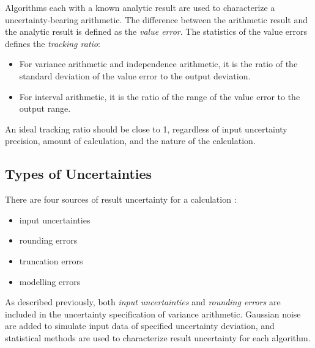 \documentclass[twoside]{article}
\numberwithin{equation}{section}
\begin{document}
Algorithms each with a known analytic result are used to characterize a uncertainty-bearing arithmetic. 
The difference between the arithmetic result and the analytic result is defined as the \emph{value error}.
The statistics of the value errors defines the \emph{tracking ratio}:
\begin{itemize}
\item For variance arithmetic and independence arithmetic, it is the ratio of the standard deviation of the value error to the output deviation.

\item For interval arithmetic, it is the ratio of the range of the value error to the output range.
\end{itemize}
An ideal tracking ratio should be close to 1, regardless of input uncertainty precision, amount of calculation, and the nature of the calculation.


\subsection{Types of Uncertainties}

There are four sources of result uncertainty for a calculation \cite{Statistical_Methods}\cite{Numerical_Recipes}:
\begin{itemize}
\item input uncertainties
\item rounding errors
\item truncation errors
\item modelling errors
\end{itemize}

As described previously, both \emph{input uncertainties} and \emph{rounding errors} are included in the uncertainty specification of variance arithmetic.
Gaussian noise are added to simulate input data of specified uncertainty deviation, and statistical methods are used to characterize result uncertainty for each algorithm.
\end{document}
